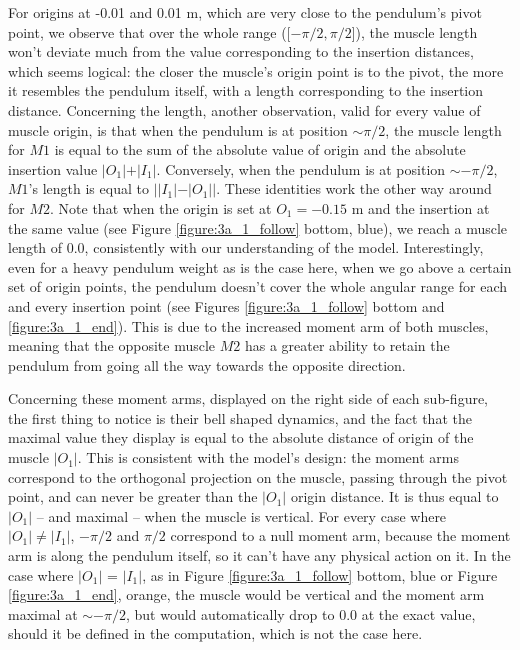 \documentclass{cmc}
\begin{document}
For origins at -0.01 and 0.01 m, which are very close to the pendulum's pivot point, we observe that over the whole range ([$-\pi/2, \pi/2$]), the muscle length won't deviate much from the value corresponding to the insertion distances, which seems logical: the closer the muscle's origin point is to the pivot, the more it resembles the pendulum itself, with a length corresponding to the insertion distance. Concerning the length, another observation, valid for every value of muscle origin, is that when the pendulum is at position $\sim\pi/2$, the muscle length for $M1$ is equal to the sum of the absolute value of origin and the absolute insertion value $\vert O_1\vert + \vert I_1\vert$. Conversely, when the pendulum is at position $\sim-\pi/2$, $M1$'s length is equal to $\bigr\rvert\vert I_1\vert - \vert O_1\vert\bigr\rvert$. These identities work the other way around for $M2$. Note that when the origin is set at $O_1 = -0.15$ m and the insertion at the same value (see Figure \ref{figure:3a_1_follow} bottom, blue), we reach a muscle length of 0.0, consistently with our understanding of the model. Interestingly, even for a heavy pendulum weight as is the case here, when we go above a certain set of origin points, the pendulum doesn't cover the whole angular range for each and every insertion point (see Figures \ref{figure:3a_1_follow} bottom and \ref{figure:3a_1_end}). This is due to the increased moment arm of both muscles, meaning that the opposite muscle $M2$ has a greater ability to retain the pendulum from going all the way towards the opposite direction.

Concerning these moment arms, displayed on the right side of each sub-figure, the first thing to notice is their bell shaped dynamics, and the fact that the maximal value they display is equal to the absolute distance of origin of the muscle $\vert O_1\vert$. This is consistent with the model's design: the moment arms correspond to the orthogonal projection on the muscle, passing through the pivot point, and can never be greater than the $\vert O_1\vert$ origin distance. It is thus equal to $\vert O_1\vert$ -- and maximal -- when the muscle is vertical. For every case where $\vert O_1\vert\neq\vert I_1\vert$, $-\pi/2$ and $\pi/2$ correspond to a null moment arm, because the moment arm is along the pendulum itself, so it can't have any physical action on it. In the case where $\vert O_1\vert$ = $\vert I_1\vert$, as in Figure \ref{figure:3a_1_follow} bottom, blue or Figure \ref{figure:3a_1_end}, orange, the muscle would be vertical and the moment arm maximal at $\sim-\pi/2$, but would automatically drop to 0.0 at the exact value, should it be defined in the computation, which is not the case here.
\end{document}

